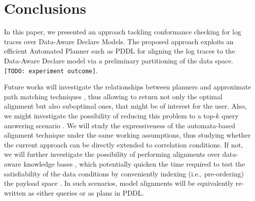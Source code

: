 \section{Conclusions}
In this paper, we presented an approach tackling conformance checking for log traces over Data-Aware Declare Models. The proposed approach exploits an efficient Automated Planner such as PDDL for aligning the log traces to the Data-Aware Declare model via a preliminary partitioning of the data space. \texttt{\color{red}[TODO: experiment outcome]}.

Future works will investigate the relationships between planners and approximate path matching techniques \cite{Myers1989}, thus allowing to return not only the optimal alignment but also suboptimal ones, that might be of interest for the user. Also, we might investigate the possibility of reducing this problem to a top-$k$ query answering scenario \cite{Ciaccia}. We will study the expressiveness of the automata-based alignment technique under the same working assumptions, thus studying whether the current approach can be directly extended to correlation conditions. If not, we will further investigate the possibility of performing alignments over data-aware knowledge bases \cite{10.1007/978-3-319-39696-5_18}, which potentially quicken the time required to test the satisfiability of the data conditions by conveniently indexing (i.e., pre-ordering) the payload space \cite{IdreosGNMMK12}. In such scenarios, model alignments will be equivalently re-written as either queries or as plans in PDDL.